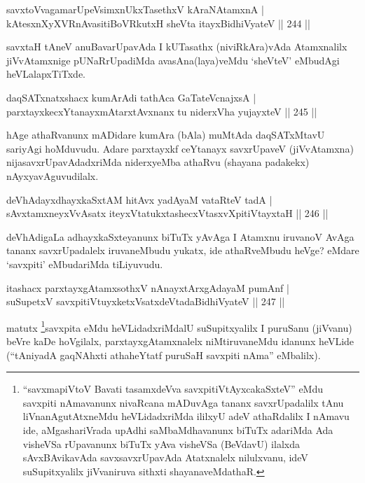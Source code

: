 
\begin{shl}
savxtoVvagamarUpeV\s simxnUkxTasethxV kAraNAtamxnA |\\
kAtesxnXyXVRnAvasitiBoVRkutxH sheVta itayxBidhiVyateV \hfill || 244 ||
\end{shl}

\begin{artha}
savxtaH tAneV anuBavarUpavAda I kUTasathx (niviRkAra)vAda Atamxnalilx jiVvAtamxnige pUNaRrUpadiMda avasAna(laya)veMdu `sheVteV' eMbudAgi heVLalapxTiTxde.
\end{artha}


\begin{shl}
daqSATxnatxshacx kumArAdi tathAca GaTateV\s cnajxsA |\\
parxtayxkecxYtanayxmAtarxtAvxnanx tu niderxVha yujayxteV \hfill || 245 ||
\end{shl}

\begin{artha}
hAge athaRvanunx mADidare kumAra (bAla) muMtAda daqSATxMtavU sariyAgi hoMduvudu. Adare parxtayxkf ceYtanayx savxrUpaveV (jiVvAtamxna) nijasavxrUpavAdadxriMda niderxyeMba athaRvu (shayana padakekx) nAyxyavAguvudilalx.
\end{artha}

\begin{shl}
deVhAdayxdhayxkaSxtAM hitAvx yadA\s yaM vataRteV tadA |\\
sAvxtamxneyxVvA\s \s satx iteyxVtatukxtashecxVtasxvXpitiVtayxtaH \hfill || 246 ||
\end{shl}

\begin{artha}
deVhAdigaLa adhayxkaSxteyanunx biTuTx yAvAga I Atamxnu iruvanoV AvAga tananx savxrUpadalelx iruvaneMbudu yukatx, ide athaRveMbudu heVge? eMdare `savxpiti' eMbudariMda tiLiyuvudu.
\end{artha}


\begin{shl}
itashacx parxtayxgAtamxsothxV nAnayxtArxgAdayaM pumAnf |\\
suSupetxV savxpitiVtuyxketxVsatxdeVtadaBidhiVyateV \hfill || 247 ||
\end{shl}

\begin{artha}
matutx \footnote{``savxmapiVtoV Bavati tasamxdeVva savxpitiVtAyxcakaSxteV'' eMdu savxpiti nAmavanunx nivaRcana mADuvAga 
tananx savxrUpadalilx tAnu liVnanAgutAtxneMdu heVLidadxriMda ililxyU 
adeV athaRdalilx I nAmavu ide, aMgashariVrada upAdhi saMbaMdhavanunx biTuTx adariMda Ada visheVSa rUpavanunx biTuTx yAva visheVSa (BeVdavU) ilalxda sAvxBAvikavAda savxsavxrUpavAda Atatxnalelx nilulxvanu, ideV suSupitxyalilx jiVvaniruva sithxti shayanaveMdathaR.}savxpita eMdu heVLidadxriMdalU suSupitxyalilx I puruSanu (jiVvanu) beVre kaDe hoVgilalx, parxtayxgAtamxnalelx niMtiruvaneMdu idanunx heVLide (``tAniyadA gaqNAhxti athaheYtatf puruSaH savxpiti nAma'' eMbalilx).
\end{artha}

